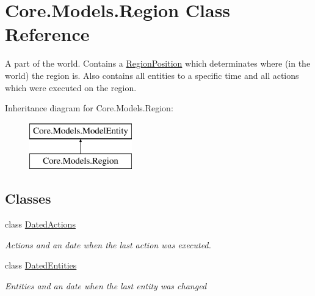 \hypertarget{classCore_1_1Models_1_1Region}{}\section{Core.\+Models.\+Region Class Reference}
\label{classCore_1_1Models_1_1Region}


A part of the world. Contains a \hyperlink{classCore_1_1Models_1_1RegionPosition}{Region\+Position} which determinates where (in the world) the region is. Also contains all entities to a specific time and all actions which were executed on the region.  


Inheritance diagram for Core.\+Models.\+Region\+:\begin{figure}[H]
\begin{center}
\leavevmode
\includegraphics[height=2.000000cm]{classCore_1_1Models_1_1Region}
\end{center}
\end{figure}
\subsection*{Classes}
\begin{DoxyCompactItemize}
\item 
class \hyperlink{classCore_1_1Models_1_1Region_1_1DatedActions}{Dated\+Actions}
\begin{DoxyCompactList}\small\item\em Actions and an date when the last action was executed. \end{DoxyCompactList}\item 
class \hyperlink{classCore_1_1Models_1_1Region_1_1DatedEntities}{Dated\+Entities}
\begin{DoxyCompactList}\small\item\em Entities and an date when the last entity was changed \end{DoxyCompactList}\end{DoxyCompactItemize}
